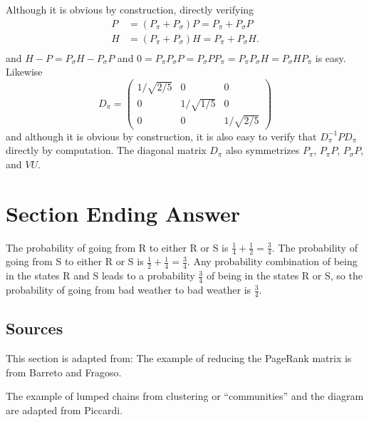 \documentclass[12pt]{article}
\begin{document}
\begin{example}
      Although it is obvious by construction, directly verifying
      \begin{align*}
           P &= (P_{\pi} + P_{\sigma}) P = P_{\pi} + P_{\sigma}P \\
           H &= (P_{\pi} + P_{\sigma}) H = P_{\pi} + P_{\sigma}H.\\
      \end{align*}
      and
      \( H - P = P_{\sigma}H - P_{\sigma}P \) and \( 0 = P_{\pi}
            P_{\sigma} P = P_{\sigma} P P_{\pi} = P_{\pi} P_{\sigma} H =
            P_{\sigma} H P_{\pi} \) is easy.
      Likewise
      \[
        D_{\pi} =
        \begin{pmatrix}
          1/\sqrt{2/5} & 0 & 0 \\
          0 & 1/\sqrt{1/5} & 0 \\
          0 & 0 & 1/\sqrt{2/5}
        \end{pmatrix}
      \]        
      and although it is obvious by construction, it is also easy to
      verify that  \( D_{\pi}^{-1}P D_{\pi} \) directly by
      computation.
      The diagonal matrix \( D_{\pi} \) also symmetrizes \(
            P_{\pi} \), \( P_{\pi}P \), \( P_{\sigma}P \), and \( VU \).
\end{example}
          

\section*{Section Ending Answer}

The probability of going from R to either R or S is \( \frac{1}{4} +
\frac{1}{2} = \frac{3}{4} \). The probability of going from S to either
R or S is \( \frac{1}{2} + \frac{1}{4} = \frac{3}{4} \).  Any
probability combination of being in the states R and S leads to a
probability \( \frac{3}{4} \) of being in the states R or S, so the
probability of going from bad weather to bad weather is \( \frac{3}{4} \).

\subsection*{Sources} This section is adapted from: The example of
reducing the PageRank matrix is from 
{Barreto and Fragoso}.

The example of lumped chains from clustering or ``communities'' and the
diagram are adapted from 
{Piccardi}.
\end{document}

